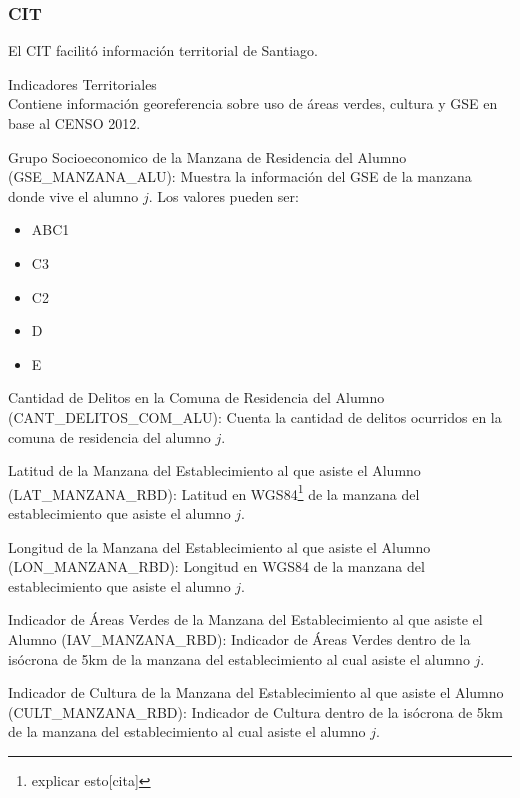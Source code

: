 \subsubsection{CIT}
El CIT facilitó información territorial de Santiago.
\begin{longdescription}
  \item[Indicadores Territoriales] \hfill \\
  Contiene información georeferencia sobre uso de áreas verdes, cultura y GSE en base al CENSO 2012.
    \begin{longdescription}
        \item[Grupo Socioeconomico de la Manzana de Residencia del Alumno] (GSE\_MANZANA\_ALU): Muestra la información del GSE de la manzana donde vive el alumno $j$.
        Los valores pueden ser:
        \begin{itemize}
        \item ABC1
        \item C3
        \item C2
        \item D
        \item E
        \end{itemize}
        \item[Cantidad de Delitos en la Comuna de Residencia del Alumno](CANT\_DELITOS\_COM\_ALU): Cuenta la cantidad de delitos ocurridos en la comuna de residencia del alumno $j$.
        
        \item[Latitud de la Manzana del Establecimiento al que asiste el Alumno](LAT\_MANZANA\_RBD): Latitud en WGS84\footnote{explicar esto[cita]} de la manzana del establecimiento que asiste el alumno $j$.
        
        \item[Longitud de la Manzana del Establecimiento al que asiste el Alumno](LON\_MANZANA\_RBD): Longitud en WGS84 de la manzana del establecimiento que asiste el alumno $j$.
        
        \item[Indicador de Áreas Verdes de la Manzana del Establecimiento al que asiste el Alumno](IAV\_MANZANA\_RBD): Indicador de Áreas Verdes dentro de la isócrona de 5km de la manzana del establecimiento al cual asiste el alumno $j$.
        
        \item[Indicador de Cultura de la Manzana del Establecimiento al que asiste el Alumno ](CULT\_MANZANA\_RBD): Indicador de Cultura dentro de la isócrona de 5km de la manzana del establecimiento al cual asiste el alumno $j$.
        

\end{longdescription}
\end{longdescription}
